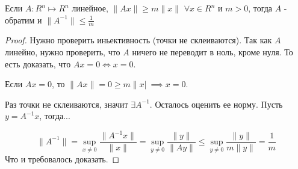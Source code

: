 
\begin{theorem} \thmslashn

	Если $A : R^n \mapsto R^n$ линейное, $\|Ax \| \ge m\|x\|$ $\forall x \in R^n$ и $m>0$, тогда $A$ - обратим и $\|A^{-1}\| \le \frac{1}{m}$
	\begin{proof} \thmslashn

		Нужно проверить иньективность (точки не склеиваются). Так как $A$ линейно, нужно проверить, что $A$ ничего не переводит в ноль, кроме нуля. То есть доказать, что $Ax = 0 \iff x = 0$.
		
		Если $Ax = 0$, то $\|Ax\| = 0 \ge m\|x|\ \implies x = 0$.
		
		Раз точки не склеиваются, значит $\exists A^{-1}$. Осталось оценить ее норму. Пусть $y = A^{-1}x$, тогда...
		
		\[
		\|A^{-1}\|
		=
		\sup_{x\neq0}\frac{\|A^{-1}x\|}{\|x\|}
		=
		\sup_{y\neq0}\frac{\|y\|}{\|Ay\|}
		\le
		\sup_{y\neq0}\frac{\|y\|}{m\|y\|}
		=
		\frac{1}{m}
		\]
		Что и требовалось доказать.
	\end{proof}
\end{theorem}

